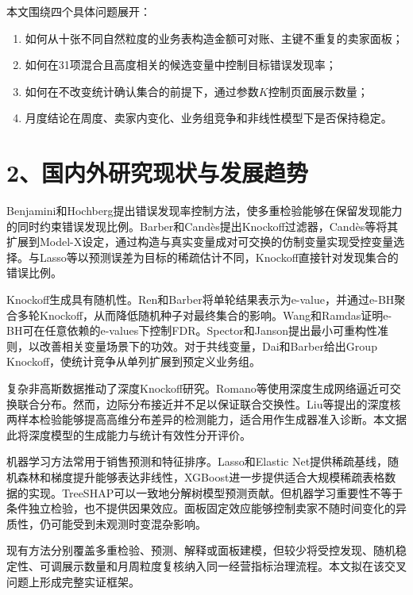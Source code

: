 \documentclass[UTF8,12pt,a4paper]{ctexart}
\begin{document}
本文围绕四个具体问题展开：
\begin{enumerate}
  \item 如何从十张不同自然粒度的业务表构造金额可对账、主键不重复的卖家面板；
  \item 如何在31项混合且高度相关的候选变量中控制目标错误发现率；
  \item 如何在不改变统计确认集合的前提下，通过参数$K$控制页面展示数量；
  \item 月度结论在周度、卖家内变化、业务组竞争和非线性模型下是否保持稳定。
\end{enumerate}

\newpage
\section*{2、国内外研究现状与发展趋势}

Benjamini和Hochberg提出错误发现率控制方法，使多重检验能够在保留发现能力的同时约束错误发现比例\cite{bh1995}。Barber和Candès提出Knockoff过滤器，Candès等将其扩展到Model-X设定，通过构造与真实变量成对可交换的仿制变量实现受控变量选择\cite{barber2015,candes2018}。与Lasso等以预测误差为目标的稀疏估计不同，Knockoff直接针对发现集合的错误比例。

Knockoff生成具有随机性。Ren和Barber将单轮结果表示为e-value，并通过e-BH聚合多轮Knockoff，从而降低随机种子对最终集合的影响\cite{ren2024}。Wang和Ramdas证明e-BH可在任意依赖的e-values下控制FDR\cite{wang2022}。Spector和Janson提出最小可重构性准则，以改善相关变量场景下的功效\cite{spector2022}。对于共线变量，Dai和Barber给出Group Knockoff，使统计竞争从单列扩展到预定义业务组\cite{dai2016}。

复杂非高斯数据推动了深度Knockoff研究。Romano等使用深度生成网络逼近可交换联合分布\cite{romano2020}。然而，边际分布接近并不足以保证联合交换性。Liu等提出的深度核两样本检验能够提高高维分布差异的检测能力\cite{liu2020}，适合用作生成器准入诊断。本文据此将深度模型的生成能力与统计有效性分开评价。

机器学习方法常用于销售预测和特征排序。Lasso和Elastic Net提供稀疏基线\cite{tibshirani1996,zou2005}，随机森林和梯度提升能够表达非线性\cite{breiman2001,friedman2001}，XGBoost进一步提供适合大规模稀疏表格数据的实现\cite{chen2016}。TreeSHAP可以一致地分解树模型预测贡献\cite{lundberg2017,lundberg2020}。但机器学习重要性不等于条件独立检验，也不提供因果效应。面板固定效应能够控制卖家不随时间变化的异质性\cite{wooldridge2010}，仍可能受到未观测时变混杂影响。

现有方法分别覆盖多重检验、预测、解释或面板建模，但较少将受控发现、随机稳定性、可调展示数量和月周粒度复核纳入同一经营指标治理流程。本文拟在该交叉问题上形成完整实证框架。
\end{document}
